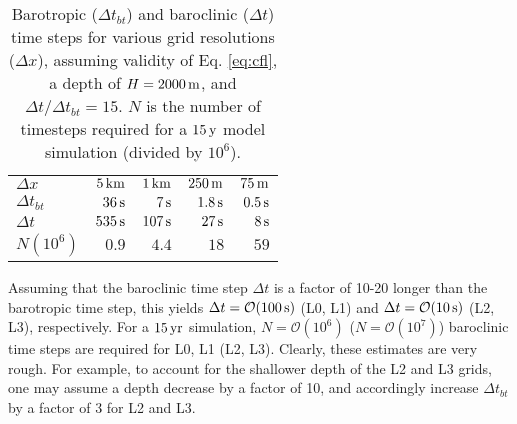 \documentclass[12pt,a4paper]{article}
\begin{document}
\begin {table}[H]
\begin{center}
	\begin{tabular}{ l | r | r | r| r }
		           $\Delta x$     & $5\,\rm km$ & $1\,\rm km$ & $250\,\rm m$ & $75\,\rm m$\\
		 $\Delta t_{bt}$       &  $36\,\rm s$ & $7\,\rm s$   &$1.8\,\rm s$       &  $0.5\,\rm s$\\
		 $\Delta t$       &  $535\,\rm s$ & $107\,\rm s$   &$27\,\rm s$       &  $8\,\rm s$ \\
		 $N (10^6)$                  &  $0.9$ & $4.4$   &$18$       &  $59$
	\end{tabular}

\end{center}\caption{Barotropic ($\Delta t_{bt}$) and baroclinic ($\Delta t$) time steps for various grid resolutions ($\Delta x$), assuming validity of Eq. \eqref{eq:cfl}, a depth of $H=2000\,\rm m$,  and  $\Delta t/\Delta t_{bt}=15$. $N$ is the number of timesteps required for a $15\,\rm y$ model simulation (divided by $10^6$).}\label{tab:timesteps}
\end{table}

Assuming that the baroclinic time step $\Delta t$ is a factor of 10-20 longer than the barotropic time step, this yields $\Delta t=\mathcal{O}(100\,\rm s)$ (L0, L1) and $\Delta t= \mathcal{O}(10\,\rm s)$ (L2, L3), respectively. For a $15\,\rm yr$ simulation, $N=\mathcal{O}(10^6)$ ($N=\mathcal{O}(10^7)$) baroclinic time steps are required for L0, L1 (L2, L3). Clearly, these estimates are very rough. For example, to account for the shallower depth of the L2 and L3 grids,  one may assume a depth decrease by a factor of 10, and accordingly increase $\Delta t_{bt}$ by a factor of 3 for L2 and L3. 
\end{document}
